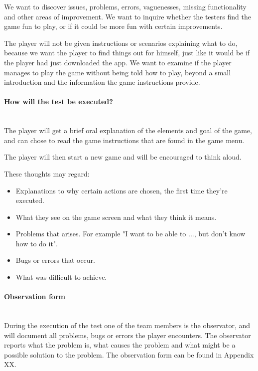 		We want to discover issues, problems, errors, vaguenesses, missing functionality and other areas 
		of improvement. We want to inquire whether the testers find the game fun to play, or if it could 
		be more fun with certain improvements.

		The player will not be given instructions or scenarios explaining what to do, because we want 
		the player to find things out for himself, just like it would be if the player had just 
		downloaded the app. We want to examine if the player manages to play the game without being 
		told how to play, beyond a small introduction and the information the game instructions provide. 

	\paragraph{How will the test be executed?}\mbox{}\\

		The player will get a brief oral explanation of the elements and goal of the game, 
		and can chose to read the game instructions that are found in the game menu.

		The player will then start a new game and will be encouraged to think aloud. 

		These thoughts may regard:

		\begin{itemize}
		  \item Explanations to why certain actions are chosen, the first time they're executed.
		  \item What they see on the game screen and what they think it means.
		  \item Problems that arises. For example "I want to be able to ..., but don't know how to do it". 
		  \item Bugs or errors that occur.
		  \item What was difficult to achieve.
		\end{itemize}

	\paragraph{Observation form}\mbox{}\\

		During the execution of the test one of the team members is the observator, and will document all problems, bugs or errors the player encounters. The observator reports what the problem is, what causes the problem and what might be a possible solution to the problem. The observation form can be found in Appendix XX.

